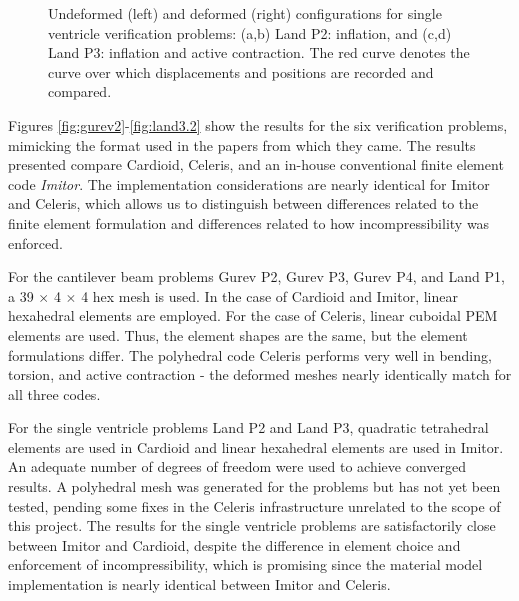 \begin{figure}[ht]
{\label{fig:ventricles3}}		
%
\caption{Undeformed (left) and deformed (right) configurations for single ventricle verification problems: (a,b) Land P2: inflation, and (c,d) Land P3: inflation and active contraction. The red curve denotes the curve over which displacements and positions are recorded and compared.}
\label{fig:ventricles}
\end{figure}

Figures \ref*{fig:gurev2}-\ref*{fig:land3.2} show the results for the six verification problems, mimicking the format used in the papers from which they came. The results presented compare Cardioid, Celeris, and an in-house conventional finite element code \textit{Imitor}. The implementation considerations are nearly identical for Imitor and Celeris, which allows us to distinguish between differences related to the finite element formulation and differences related to how incompressibility was enforced.

For the cantilever beam problems Gurev P2, Gurev P3, Gurev P4, and Land P1, a 39 $\times$ 4 $\times$ 4 hex mesh is used. In the case of Cardioid and Imitor, linear hexahedral elements are employed. For the case of Celeris, linear cuboidal PEM elements are used. Thus, the element shapes are the same, but the element formulations differ. The polyhedral code Celeris performs very well in bending, torsion, and active contraction - the deformed meshes nearly identically match for all three codes.

For the single ventricle problems Land P2 and Land P3, quadratic tetrahedral elements are used in Cardioid and linear hexahedral elements are used in Imitor. An adequate number of degrees of freedom were used to achieve converged results. A polyhedral mesh was generated for the problems but has not yet been tested, pending some fixes in the Celeris infrastructure unrelated to the scope of this project. The results for the single ventricle problems are satisfactorily close between Imitor and Cardioid, despite the difference in element choice and enforcement of incompressibility, which is promising since the material model implementation is nearly identical between Imitor and Celeris.

